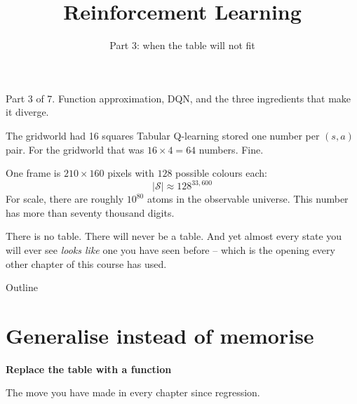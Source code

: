 \documentclass[aspectratio=169]{beamer}
\title{Reinforcement Learning}
\subtitle{Part 3: when the table will not fit}
\author{}
\date{}
\begin{document}
\begin{frame}
  \titlepage
  \begin{center}\scriptsize\color{gray}
    Part 3 of 7. Function approximation, DQN, and the three ingredients that make it diverge.
  \end{center}
\end{frame}

\begin{frame}{The gridworld had 16 squares}
  \small
  Tabular Q-learning stored one number per $(s,a)$ pair. For the gridworld that was
  $16 \times 4 = 64$ numbers. Fine.

  \vskip 8pt
  \begin{center}
  \begin{tcolorbox}[colback=armred!8, colframe=armred, boxrule=0.8pt, arc=2pt, width=0.82\textwidth,
                    title={\textbf{Now play Atari from the screen}}]
    \small
    One frame is $210 \times 160$ pixels with $128$ possible colours each:
    \[ |\mathcal{S}| \approx 128^{33{,}600} \]
    \vskip 2pt
    For scale, there are roughly $10^{80}$ atoms in the observable universe. This number has
    more than seventy thousand digits.
  \end{tcolorbox}
  \end{center}

  \vskip 10pt
  \begin{center}
    \small
    There is no table. There will never be a table. And yet almost every state you will ever
    see \emph{looks like} one you have seen before -- which is the opening every other chapter
    of this course has used.
  \end{center}
\end{frame}

\begin{frame}{Outline}
  \tableofcontents
\end{frame}

\section{Generalise instead of memorise}
\begin{frame}[plain]
  \begin{center}
    \vskip 1.6cm
    {\Huge\bfseries\color{popblue}Replace the table with a function}

    \vskip 0.6cm
    {\large The move you have made in every chapter since regression.}
  \end{center}
\end{frame}
\end{document}

